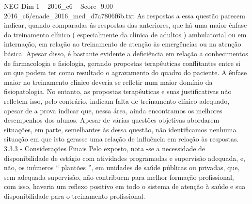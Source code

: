 \begin{textsample}{NEG Dim 1 – 2016\_c6 – Score -9.00 – 2016\_c6/enade\_2016\_med\_d7a7806f6b.txt}
As respostas a essa questão parecem indicar, quando comparadas às respostas das anteriores, que há uma maior ênfase do treinamento clínico ( especialmente da clínica de adultos ) ambulatorial ou em internação, em relação ao treinamento de atenção às emergências ou na atenção básica.
Apesar disso, é bastante evidente a deficiência em relação a conhecimentos de farmacologia e fisiologia, gerando propostas terapêuticas conflitantes entre si ou que podem ter como resultado o agravamento do quadro do paciente.
A ênfase maior no treinamento clínico deveria se refletir num maior domínio da fisiopatologia.
No entanto, as propostas terapêuticas e suas justificativas não refletem isso, pelo contrário, indicam falta de treinamento clínico adequado, apesar de a prova indicar que, nessa área, ainda encontramos os melhores desempenhos dos alunos.
Apesar de várias questões objetivas abordarem situações, em parte, semelhantes às dessa questão, não identificamos nenhuma situação em que isto gerasse uma relação de influência em relação às respostas. 3.3.3 - Considerações Finais Pelo exposto, nota -se a necessidade de disponibilidade de estágio com atividades programadas e supervisão adequada, e, não, os inúmeros “ plantões ”, em unidades de saúde públicas ou privadas, que, sem adequada supervisão, não contribuem para melhor formação profissional, com isso, haveria um reflexo positivo em todo o sistema de atenção à saúde e sua disponibilidade para o treinamento profissional.

\end{textsample}
